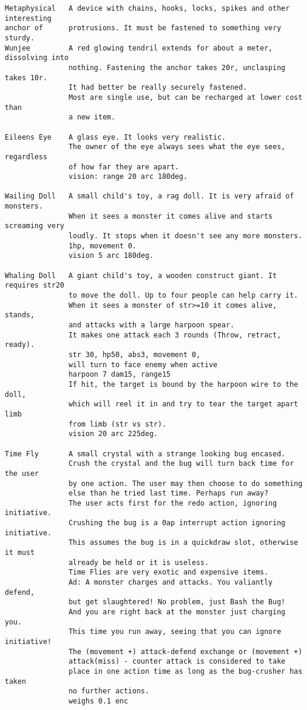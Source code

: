 \begin{verbatim}
Metaphysical   A device with chains, hooks, locks, spikes and other interesting
anchor of      protrusions. It must be fastened to something very sturdy.
Wunjee         A red glowing tendril extends for about a meter, dissolving into
               nothing. Fastening the anchor takes 20r, unclasping takes 10r.
               It had better be really securely fastened.
               Most are single use, but can be recharged at lower cost than
               a new item.

Eileens Eye    A glass eye. It looks very realistic.
               The owner of the eye always sees what the eye sees, regardless
               of how far they are apart.
               vision: range 20 arc 180deg.

Wailing Doll   A small child's toy, a rag doll. It is very afraid of monsters.
               When it sees a monster it comes alive and starts screaming very
               loudly. It stops when it doesn't see any more monsters.
               1hp, movement 0.
               vision 5 arc 180deg.

Whaling Doll   A giant child's toy, a wooden construct giant. It requires str20
               to move the doll. Up to four people can help carry it.
               When it sees a monster of str>=10 it comes alive, stands,
               and attacks with a large harpoon spear.
               It makes one attack each 3 rounds (Throw, retract, ready).
               str 30, hp50, abs3, movement 0,
               will turn to face enemy when active
               harpoon 7 dam15, range15
               If hit, the target is bound by the harpoon wire to the doll,
               which will reel it in and try to tear the target apart limb
               from limb (str vs str).
               vision 20 arc 225deg.

Time Fly       A small crystal with a strange looking bug encased.
               Crush the crystal and the bug will turn back time for the user
               by one action. The user may then choose to do something
               else than he tried last time. Perhaps run away?
               The user acts first for the redo action, ignoring initiative.
               Crushing the bug is a 0ap interrupt action ignoring initiative.
               This assumes the bug is in a quickdraw slot, otherwise it must
               already be held or it is useless.
               Time Flies are very exotic and expensive items.
               Ad: A monster charges and attacks. You valiantly defend,
               but get slaughtered! No problem, just Bash the Bug!
               And you are right back at the monster just charging you.
               This time you run away, seeing that you can ignore initiative!
               The (movement +) attack-defend exchange or (movement +)
               attack(miss) - counter attack is considered to take
               place in one action time as long as the bug-crusher has taken
               no further actions.
               weighs 0.1 enc


\end{verbatim}
